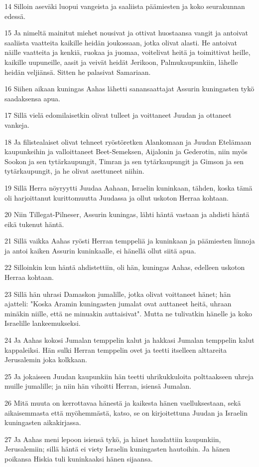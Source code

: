 \par 14 Silloin aseväki luopui vangeista ja saaliista päämiesten ja koko seurakunnan edessä.
\par 15 Ja nimeltä mainitut miehet nousivat ja ottivat huostaansa vangit ja antoivat saaliista vaatteita kaikille heidän joukossaan, jotka olivat alasti. He antoivat näille vaatteita ja kenkiä, ruokaa ja juomaa, voitelivat heitä ja toimittivat heille, kaikille uupuneille, aasit ja veivät heidät Jerikoon, Palmukaupunkiin, lähelle heidän veljiänsä. Sitten he palasivat Samariaan.
\par 16 Siihen aikaan kuningas Aahas lähetti sanansaattajat Assurin kuningasten tykö saadaksensa apua.
\par 17 Sillä vielä edomilaisetkin olivat tulleet ja voittaneet Juudan ja ottaneet vankeja.
\par 18 Ja filistealaiset olivat tehneet ryöstöretken Alankomaan ja Juudan Etelämaan kaupunkeihin ja valloittaneet Beet-Semeksen, Aijalonin ja Gederotin, niin myös Sookon ja sen tytärkaupungit, Timran ja sen tytärkaupungit ja Gimson ja sen tytärkaupungit, ja he olivat asettuneet niihin.
\par 19 Sillä Herra nöyryytti Juudaa Aahaan, Israelin kuninkaan, tähden, koska tämä oli harjoittanut kurittomuutta Juudassa ja ollut uskoton Herraa kohtaan.
\par 20 Niin Tillegat-Pilneser, Assurin kuningas, lähti häntä vastaan ja ahdisti häntä eikä tukenut häntä.
\par 21 Sillä vaikka Aahas ryösti Herran temppeliä ja kuninkaan ja päämiesten linnoja ja antoi kaiken Assurin kuninkaalle, ei hänellä ollut siitä apua.
\par 22 Silloinkin kun häntä ahdistettiin, oli hän, kuningas Aahas, edelleen uskoton Herraa kohtaan.
\par 23 Sillä hän uhrasi Damaskon jumalille, jotka olivat voittaneet hänet; hän ajatteli: "Koska Aramin kuningasten jumalat ovat auttaneet heitä, uhraan minäkin niille, että ne minuakin auttaisivat". Mutta ne tulivatkin hänelle ja koko Israelille lankeemukseksi.
\par 24 Ja Aahas kokosi Jumalan temppelin kalut ja hakkasi Jumalan temppelin kalut kappaleiksi. Hän sulki Herran temppelin ovet ja teetti itselleen alttareita Jerusalemin joka kolkkaan.
\par 25 Ja jokaiseen Juudan kaupunkiin hän teetti uhrikukkuloita polttaakseen uhreja muille jumalille; ja niin hän vihoitti Herran, isiensä Jumalan.
\par 26 Mitä muuta on kerrottavaa hänestä ja kaikesta hänen vaelluksestaan, sekä aikaisemmasta että myöhemmästä, katso, se on kirjoitettuna Juudan ja Israelin kuningasten aikakirjassa.
\par 27 Ja Aahas meni lepoon isiensä tykö, ja hänet haudattiin kaupunkiin, Jerusalemiin; sillä häntä ei viety Israelin kuningasten hautoihin. Ja hänen poikansa Hiskia tuli kuninkaaksi hänen sijaansa.

